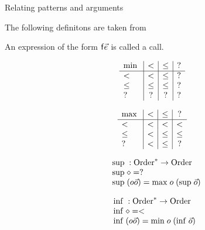 \begin{definition}{Relating patterns and arguments}
\end{definition}

The following definitons are taken from \cite{abelAltenkirch:predStRec}

\begin{definition}
An expression of the form $\mathsf{f} \vec{e}$ is called a call.
\end{definition}

\newcommand{\mino}{\mathrm{min}\;}
\newcommand{\maxo}{\mathrm{max}\;}
\newcommand{\supo}{\mathrm{sup}\;}
\newcommand{\info}{\mathrm{inf}\;}

\begin{definition}
\[
\begin{array}{l | c |c | c}
 \mino &  <      &  \leq    & ? \\
\hline
  <    & <       &  \leq    &   ? \\
 \leq  & \leq    &  \leq    &   ?  \\
 ?     & ?       &  ?       &   ?
\end{array}
\]
\end{definition}

\begin{definition}
\[
\begin{array}{l | c |c | c}
 \maxo & <      &  \leq    &   ? \\
\hline
  <    & <       & <       &   <    \\
 \leq  & <       & \leq    &   \leq  \\
 ?     & <       & \leq    &   ?
\end{array}
\]
\end{definition}

\begin{definition}
\[
\begin{array}[t]{ll}
\multicolumn{2}{l}{\supo : \ves{\order} \ra \order}\\ 
\supo \diamond = ? \\
\supo (o \vec{o} ) = \maxo o \; (\supo \vec{o}) \\
\end{array}
\]
\end{definition}

\begin{definition}
\[
\begin{array}[t]{ll}
\multicolumn{2}{l}{\info : \ves{\order} \ra \order}\\ 
\info \diamond = < \\
\info (o \vec{o} ) = \mino o \; (\info \vec{o}) \\
\end{array}
\]
\end{definition}

